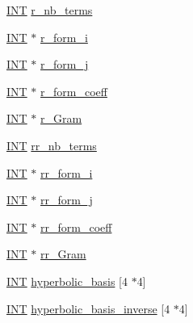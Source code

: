 \begin{DoxyCompactItemize}
\item 
\mbox{\hyperlink{galois_8h_a09fddde158a3a20bd2dcadb609de11dc}{I\+NT}} \mbox{\hyperlink{classunusual__model_a0347eeb1a586e98d505a5f2380f0d8d7}{r\+\_\+nb\+\_\+terms}}
\item 
\mbox{\hyperlink{galois_8h_a09fddde158a3a20bd2dcadb609de11dc}{I\+NT}} $\ast$ \mbox{\hyperlink{classunusual__model_a94e5ddc054d515117cc34821c3f588af}{r\+\_\+form\+\_\+i}}
\item 
\mbox{\hyperlink{galois_8h_a09fddde158a3a20bd2dcadb609de11dc}{I\+NT}} $\ast$ \mbox{\hyperlink{classunusual__model_a1f6b4f4a7c2253f63639f3b04b2e0ddd}{r\+\_\+form\+\_\+j}}
\item 
\mbox{\hyperlink{galois_8h_a09fddde158a3a20bd2dcadb609de11dc}{I\+NT}} $\ast$ \mbox{\hyperlink{classunusual__model_ade00ee4e4bf1ccbca5e9658fc1cbb2ff}{r\+\_\+form\+\_\+coeff}}
\item 
\mbox{\hyperlink{galois_8h_a09fddde158a3a20bd2dcadb609de11dc}{I\+NT}} $\ast$ \mbox{\hyperlink{classunusual__model_ac0a5bb908032908411c63c4e0559c6a4}{r\+\_\+\+Gram}}
\item 
\mbox{\hyperlink{galois_8h_a09fddde158a3a20bd2dcadb609de11dc}{I\+NT}} \mbox{\hyperlink{classunusual__model_a318ab0566a0a45f238d3696991d8f5b4}{rr\+\_\+nb\+\_\+terms}}
\item 
\mbox{\hyperlink{galois_8h_a09fddde158a3a20bd2dcadb609de11dc}{I\+NT}} $\ast$ \mbox{\hyperlink{classunusual__model_a6bf9339c306ea269f1055744a33e85e0}{rr\+\_\+form\+\_\+i}}
\item 
\mbox{\hyperlink{galois_8h_a09fddde158a3a20bd2dcadb609de11dc}{I\+NT}} $\ast$ \mbox{\hyperlink{classunusual__model_a40a4ee60a3977d9e9557afc75fcd1cdb}{rr\+\_\+form\+\_\+j}}
\item 
\mbox{\hyperlink{galois_8h_a09fddde158a3a20bd2dcadb609de11dc}{I\+NT}} $\ast$ \mbox{\hyperlink{classunusual__model_a174bd21fb0e40cda15f35278062e8641}{rr\+\_\+form\+\_\+coeff}}
\item 
\mbox{\hyperlink{galois_8h_a09fddde158a3a20bd2dcadb609de11dc}{I\+NT}} $\ast$ \mbox{\hyperlink{classunusual__model_a5f5e87a26f95e3e0a1a766c4ee5486c0}{rr\+\_\+\+Gram}}
\item 
\mbox{\hyperlink{galois_8h_a09fddde158a3a20bd2dcadb609de11dc}{I\+NT}} \mbox{\hyperlink{classunusual__model_a8ba4e06641543ebedfee0a970bbdb06f}{hyperbolic\+\_\+basis}} \mbox{[}4 $\ast$4\mbox{]}
\item 
\mbox{\hyperlink{galois_8h_a09fddde158a3a20bd2dcadb609de11dc}{I\+NT}} \mbox{\hyperlink{classunusual__model_a90af5ef1d2cb77e2a224b0f4453b5fc5}{hyperbolic\+\_\+basis\+\_\+inverse}} \mbox{[}4 $\ast$4\mbox{]}

\end{DoxyCompactItemize}
